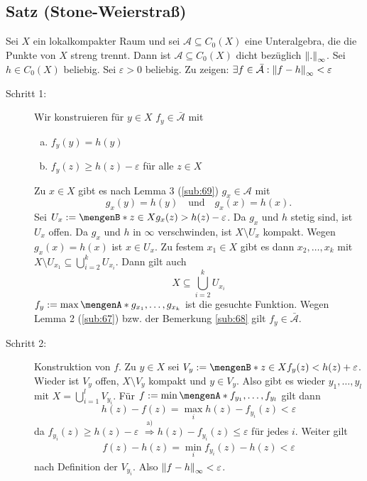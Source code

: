 \subsection{Satz (Stone-Weierstraß)} %
\label{sub:63}
Sei $X$ ein lokalkompakter Raum und sei $\mathcal{A} \subseteq C_0(X)$ eine Unteralgebra, die die Punkte von $X$ streng trennt. Dann ist $\mathcal{A} \subseteq C_0(X)$
dicht bezüglich $\norm[\infty]{.} $.
Sei $h \in C_0(X)$ beliebig. Sei $\varepsilon>0$ beliebig. Zu zeigen: $\exists f \in \bar{\mathcal{A} } : \norm[\infty]{f- h} < \varepsilon $
\begin{description}
	\item[Schritt 1:] Wir konstruieren für $y \in X$ $f_y \in \bar{\mathcal{A}}$ mit 
	\begin{enumerate}[a)]
		\item $f_y(y) = h(y)$
		\item $f_y(z) \ge h(z) - \varepsilon$ für alle $z \in X$
	\end{enumerate}
	Zu $x \in X$ gibt es nach Lemma 3 (\ref{sub:69}) $g_x \in \mathcal{A}$ mit 
	\[
		g_x(y) = h(y) \quad \text{und} \quad g_x(x) = h(x).
	\]
	Sei $U_x := \set[z \in X]{g_x(z) > h(z) - \varepsilon}$. Da $g_x$ und $h$ stetig sind, ist $U_x$ offen. Da $g_x$ und $h$ in $\infty$ verschwinden, ist 
	$X \setminus U_x$ kompakt.
	Wegen $g_x(x)= h(x)$ ist $x \in U_x$. Zu festem $x_1 \in X$ gibt es dann $x_2, \ldots , x_k$ mit $X \setminus U_{x_1} \subseteq \bigcup_{i=2}^k U_{x_i}$.
	Dann gilt auch 
	\[
		X \subseteq \bigcup_{i=2}^k U_{x_i}
	\]
	$f_y := \max \set{g_{x_1}, \ldots , g_{x_k}}$ ist die gesuchte Funktion. Wegen Lemma 2 (\ref{sub:67}) bzw. der Bemerkung \ref{sub:68} gilt $f_y \in \bar{\mathcal{A}}$.
	\item[Schritt 2:] Konstruktion von $f$. Zu $y \in X$ sei $V_y := \set[z \in X]{f_y(z) < h(z)+ \varepsilon}$. Wieder ist $V_y$ offen, $X\setminus V_y$ kompakt und
	$y \in V_y$. Also gibt es wieder $y_1, \ldots , y_l$ mit $X = \bigcup_{i=1}^l V_{y_i}$. Für $f := \min \set{f_{y_1}, \ldots , f_{y_l}}$ gilt dann
	\[
		h(z) - f(z) = \max_i h(z)- f_{y_i} (z) < \varepsilon
	\]
	da $f_{y_i}(z) \ge h(z) -\varepsilon$ $\overset{\text{a)}}{\Rightarrow } h(z)- f_{y_i}(z) \le \varepsilon$ für jedes $i$.
	Weiter gilt 
	\begin{align*}
		f(z)- h(z) = \min_i f_{y_i}(z)- h(z) < \varepsilon
	\end{align*} 
	nach Definition der $V_{y_i}$. Also $\norm[\infty]{f-h} < \varepsilon $. \bewende
\end{description}

